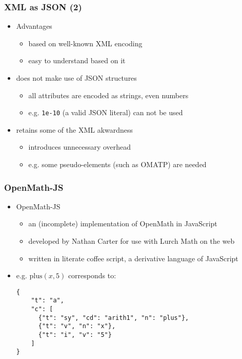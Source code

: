 \documentclass[usenames,dvipsnames]{beamer}
\makeatletter
\let\lstinline@org\lstinline
\def\lstinline{\lstinline@org[basicstyle=\ttfamily]}
\makeatother
\begin{document}
\begin{frame}[fragile]
    \frametitle{XML as JSON (2)}
    \begin{itemize}
        \item Advantages
        \begin{itemize}
            \item based on well-known XML encoding
            \item easy to understand based on it
        \end{itemize} 
        \item does not make use of JSON structures
        \begin{itemize}
            \item all attributes are encoded as strings, even numbers
            \item e.g. \lstinline{1e-10} (a valid JSON literal) can not be used
        \end{itemize}
        \item retains some of the XML akwardness
        \begin{itemize}
            \item introduces unnecessary overhead
            \item e.g. some pseudo-elements (such as OMATP) are needed
        \end{itemize}
    \end{itemize}
\end{frame}


\begin{frame}[fragile]
    \frametitle{OpenMath-JS}%
    \begin{itemize}
        \item OpenMath-JS
        \begin{itemize}
            \item an (incomplete) implementation of OpenMath in JavaScript
            \item developed by Nathan Carter for use with Lurch Math on the web
            \item written in literate coffee script, a derivative language of JavaScript
        \end{itemize}
        \item e.g. $\mathrm{plus}(x, 5)$ corresponds to:
\begin{lstlisting}
{
    "t": "a",
    "c": [  
      {"t": "sy", "cd": "arith1", "n": "plus"}, 
      {"t": "v", "n": "x"}, 
      {"t": "i", "v": "5"}
    ]
}
\end{lstlisting}
    \end{itemize}
\end{frame}
\end{document}
